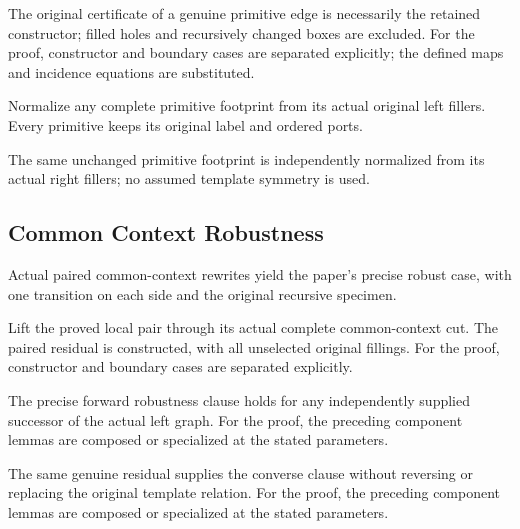 The original certificate of a genuine primitive edge is necessarily the retained constructor; filled holes and recursively changed boxes are excluded.
For the proof, constructor and boundary cases are separated explicitly; the defined maps and incidence equations are substituted.
\par{}

Normalize any complete primitive footprint from its actual original left fillers. Every primitive keeps its original label and ordered ports.
\par{}

The same unchanged primitive footprint is independently normalized from its actual right fillers; no assumed template symmetry is used.
\par{}

\subsection{Common Context Robustness}
Actual paired common-context rewrites yield the paper's precise robust case, with one transition on each side and the original recursive specimen.

Lift the proved local pair through its actual complete common-context cut. The paired residual is constructed, with all unselected original fillings.
For the proof, constructor and boundary cases are separated explicitly.
\par{}

The precise forward robustness clause holds for any independently supplied successor of the actual left graph.
For the proof, the preceding component lemmas are composed or specialized at the stated parameters.
\par{}

The same genuine residual supplies the converse clause without reversing or replacing the original template relation.
For the proof, the preceding component lemmas are composed or specialized at the stated parameters.
\par{}

